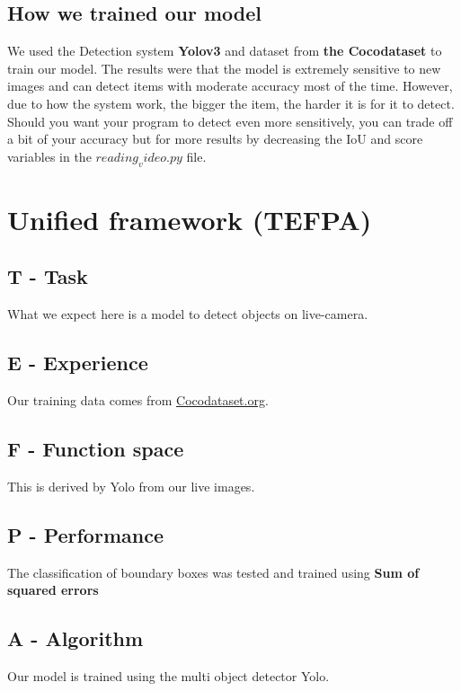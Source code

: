 \documentclass{article}
\begin{document}
\subsection{How we trained our model}
\tab We used the Detection system \textbf{Yolov3} and dataset from \textbf{the Cocodataset} to train our model. The results were that the model is extremely sensitive to new images and can detect items with moderate accuracy most of the time. However, due to how the system work, the bigger the item, the harder it is for it to detect.\\
\tab Should you want your program to detect even more sensitively, you can trade off a bit of your accuracy but for more results by decreasing the IoU and score variables in the \textbf{$reading_video.py$} file.

\section{Unified framework (TEFPA)}
\subsection{T - Task}
What we expect here is a model to detect objects on live-camera.
\subsection{E - Experience}
Our training data comes from \url{Cocodataset.org}.
\subsection{F - Function space}
This is derived by Yolo from our live images.
\subsection{P - Performance}
The classification of boundary boxes was tested and trained using \textbf{Sum of squared errors}
\subsection{A - Algorithm}
Our model is trained using the multi object detector Yolo.
\end{document}
